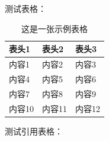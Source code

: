 测试表格：
\begin{table}[htbp]
  \centering
  \normalsize
  \caption{这是一张示例表格}
  \begin{tabular}{m{} m{} m{}}
    \toprule[2pt]
    表头1 & 表头2 & 表头3 \\
    \midrule
    内容1 & 内容2 & 内容3 \\
    内容4 & 内容5 & 内容6 \\
    内容7 & 内容8 & 内容9 \\
    \cline{2-3}
    内容10 & 内容11 & 内容12 \\
    \bottomrule[2pt]
  \end{tabular}
  \label{tab:example-table}
\end{table}

测试引用表格：

